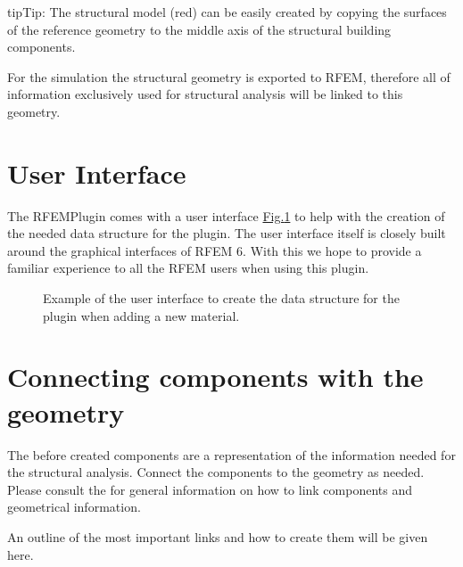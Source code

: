 \documentclass[letterpaper,10pt,english]{jupyterBook}
\let\sphinxpxdimen\pdfpxdimen\else\newdimen\sphinxpxdimen
\begin{document}
\begin{sphinxadmonition}{tip}{Tip:}
\sphinxAtStartPar
The structural model (red) can be easily created by copying the surfaces of the reference geometry to the middle axis
of the structural building components.
\end{sphinxadmonition}

\sphinxAtStartPar
For the simulation the structural geometry is exported to RFEM, therefore all of information exclusively used for
structural analysis will be linked to this geometry.


\section{User Interface}
\label{\detokenize{Setting_up_a_problem:user-interface}}
\sphinxAtStartPar
The RFEM\sphinxhyphen{}Plugin comes with a user interface \hyperref[\detokenize{Setting_up_a_problem:ui-plugin}]{Fig.\@ \ref{\detokenize{Setting_up_a_problem:ui-plugin}}} to help with the creation of the needed data structure
for the plugin. The user interface itself is closely built around the graphical interfaces of RFEM 6. With this we hope
to provide a familiar experience to all the RFEM users when using this plugin.

\begin{figure}[htbp]
\centering
\capstart

\noindent\sphinxincludegraphics[height=250\sphinxpxdimen]{{ui_plugin}.jpg}
\caption{Example of the user interface to create the data structure for the plugin when adding a new material.}\label{\detokenize{Setting_up_a_problem:ui-plugin}}\end{figure}


\section{Connecting components with the geometry}
\label{\detokenize{Setting_up_a_problem:connecting-components-with-the-geometry}}
\sphinxAtStartPar
The before created components are a representation of the information needed for the structural analysis. Connect the
components to the geometry as needed. Please consult
the 
for general information on how to link components and geometrical information.

\sphinxAtStartPar
An outline of the most important links and how to create them will be given here.
\end{document}
